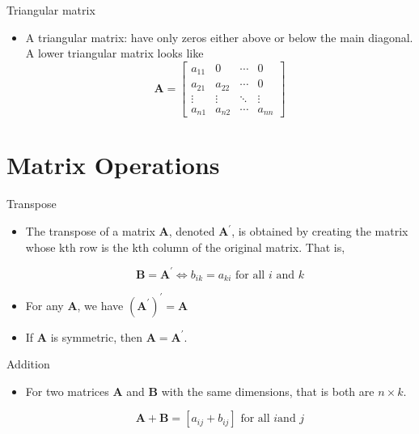 \documentclass[presentation]{beamer}
\begin{document}
\begin{frame}[label={sec:orga484e5e}]{Triangular matrix}
\begin{itemize}
\item A \alert{triangular} matrix: have only zeros either above or below the
main diagonal. A \alert{lower triangular} matrix looks like
\begin{equation*}  
\mathbf{A} = 
\begin{bmatrix}
a_{11} & 0 & \cdots & 0 \\
a_{21} & a_{22} & \cdots & 0 \\
\vdots & \vdots & \ddots & \vdots \\
a_{n1} & a_{n2} & \cdots & a_{nn}
\end{bmatrix}
\end{equation*}
\end{itemize}
\end{frame}


\section{Matrix Operations}
\label{sec:orgd688a98}

\begin{frame}[label={sec:org5182bdc}]{Transpose}
\begin{itemize}
\item The \alert{transpose} of a matrix \(\mathbf{A}\), denoted
\(\mathbf{A}^{\prime}\), is obtained by creating the matrix whose kth
row is the kth column of the original matrix. That is,

\[ \mathbf{B} = \mathbf{A}^{\prime} \Leftrightarrow b_{ik} = a_{ki}
  \text{ for all } i \text{ and } k \]

\item For any \(\mathbf{A}\), we have \((\mathbf{A}^{\prime})^{\prime} = \mathbf{A}\)
\item If \(\mathbf{A}\) is symmetric, then \(\mathbf{A} = \mathbf{A}^{\prime}\).
\end{itemize}
\end{frame}

\begin{frame}[label={sec:org3c09bc1}]{Addition}
\begin{itemize}
\item For two matrices \(\mathbf{A}\) and \(\mathbf{B}\) with the same
dimensions, that is both are \(n \times k\). 

\[\mathbf{A} + \mathbf{B} = [a_{ij} + b_{ij}] \text{ for all } i \text{
  and } j\]
\end{itemize}
\end{frame}
\end{document}
